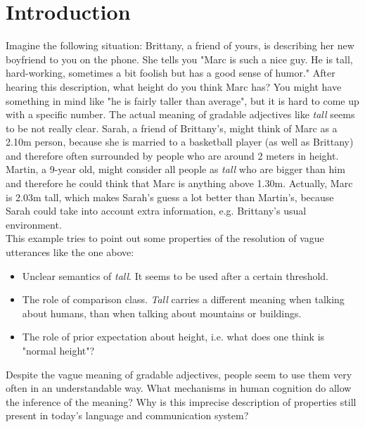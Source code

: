 \chapter{Introduction}
\label{sec:intoduction}

Imagine the following situation: Brittany, a friend of yours, is describing her new boyfriend to you on the phone. She tells you "Marc is such a nice guy. He is tall, hard-working, sometimes a bit foolish but has a good sense of humor."
After hearing this description, what height do you think Marc has? You might have something in mind like "he is fairly taller than average", but it is hard to come up with a specific number. The actual meaning of gradable adjectives like \textit{tall} seems to be not really clear. Sarah, a friend of Brittany's, might think of Marc as a 2.10m person, because she is married to a basketball player (as well as Brittany) and therefore often surrounded by people who are around 2 meters in height. Martin, a 9-year old, might consider all people as \textit{tall} who are bigger than him and therefore he could think that Marc is anything above 1.30m. Actually, Marc is 2.03m tall, which makes Sarah's guess a lot better than Martin's, because Sarah could take into account extra information, e.g. Brittany's usual environment.\\

This example tries to point out some properties of the resolution of vague utterances like the one above:
\begin{itemize}
\item Unclear semantics of \textit{tall}. It seems to be used after a certain threshold.
\item The role of comparison class. \textit{Tall} carries a different meaning when talking about humans, than when talking about mountains or buildings.
\item The role of prior expectation about height, i.e. what does one think is "normal height"?
\end{itemize}
Despite the vague meaning of gradable adjectives, people seem to use them very often in an understandable way. What mechanisms in human cognition do allow the inference of the meaning? Why is this imprecise description of properties still present in today's language and communication system?\\

